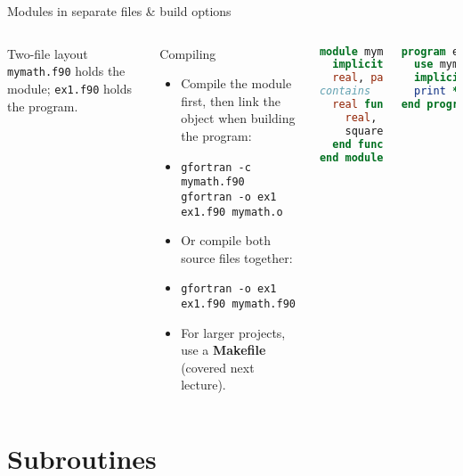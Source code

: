 \begin{frame}[fragile]{Modules in separate files \& build options}
  \begin{columns}[T]
    \begin{block}{Two-file layout}
      \texttt{mymath.f90} holds the module; \texttt{ex1.f90} holds the program.
    \end{block}
    \begin{block}{Compiling}
      \begin{itemize}
        \item Compile the module first, then link the object when building the program:
        \item[] \texttt{gfortran -c mymath.f90}\\
               \texttt{gfortran -o ex1 ex1.f90 mymath.o}
        \item Or compile both source files together:
        \item[] \texttt{gfortran -o ex1 ex1.f90 mymath.f90}
        \item For larger projects, use a \textbf{Makefile} (covered next lecture).
      \end{itemize}
    \end{block}

\begin{lstlisting}[language=Fortran,caption={mymath.f90}]
module mymath
  implicit none
  real, parameter :: pi = 3.14
contains
  real function square(a)
    real, intent(in) :: a
    square = a**2
  end function square
end module mymath
\end{lstlisting}

\begin{lstlisting}[language=Fortran,caption={ex1.f90}]
program ex1
  use mymath
  implicit none
  print *, square(2.3), pi
end program ex1
\end{lstlisting}
  \end{columns}
\end{frame}



\section{Subroutines}

